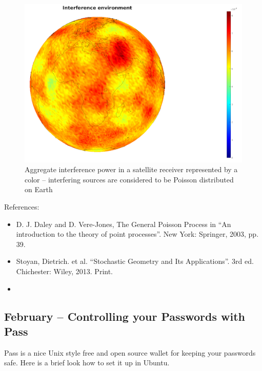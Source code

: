 \documentclass{article}
\begin{document}
\begin{figure}
  \includegraphics[width=\linewidth]{interferenceenvironment.png}
  \caption{Aggregate interference power in a satellite receiver represented by a color – interfering sources are considered to be Poisson distributed on Earth}
\end{figure}

References:
\begin{itemize}
\item D. J. Daley and D. Vere-Jones, The General Poisson Process in  ``An introduction to the theory of point processes''. New York: Springer, 2003, pp. 39. 
\item Stoyan, Dietrich. et al. ``Stochastic Geometry and Its Applications''. 3rd ed. Chichester: Wiley, 2013. Print.
\item  {}
\end{itemize}




\subsection{February – Controlling your Passwords with Pass}
Pass is a nice Unix style free and open source wallet for keeping your passwords safe. Here is a brief look how to set it up in Ubuntu.
\end{document}
